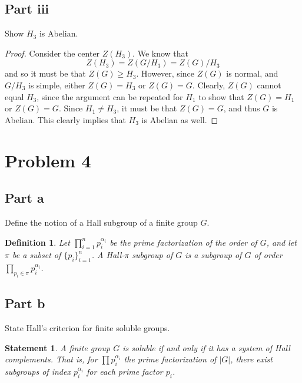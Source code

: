 \documentclass[12pt,reqno]{amsart}
\newtheorem*{definition}{Definition}
\newtheorem*{statement}{Statement}
\begin{document}
\subsection*{Part iii}
Show $H_3$ is Abelian.
\\
\begin{proof}
    Consider the center $Z(H_3)$. We know that
    \[
        Z(H_3) = Z(G/H_3) = Z(G)/H_3
    \]
    and so it must be that $Z(G)\geq H_3$. However, since $Z(G)$ is normal, and
    $G/H_3$ is simple, either $Z(G) = H_3$ or $Z(G) = G$. Clearly, $Z(G)$ cannot
    equal $H_3$, since the argument can be repeated for $H_1$ to show that $Z(G)
    = H_1$ or $Z(G)=G$. Since $H_1\neq H_3$, it must be that $Z(G) = G$, and
    thus $G$ is Abelian. This clearly implies that $H_3$ is Abelian as well.
\end{proof}

\newpage

\section*{Problem 4}
\subsection*{Part a}
Define the notion of a Hall subgroup of a finite group $G$.
\\
\begin{definition}
    Let $\prod_{i=1}^n p_i^{\alpha_i}$ be the prime factorization of the order
    of $G$, and let $\pi$ be a subset of $\{p_i\}_{i=1}^n$. A Hall-$\pi$
    subgroup of $G$ is a subgroup of $G$ of order $\prod_{p_i\in\pi}p_i^{\alpha_i}$.
\end{definition}

\subsection*{Part b}
State Hall's criterion for finite soluble groups.
\\
\begin{statement}
    A finite group $G$ is soluble if and only if it has a system of Hall
    complements. That is, for $\prod p_i^{\alpha_i}$ the prime factorization of
    $|G|$, there exist subgroups of index $p_i^{\alpha_i}$ for each prime
    factor $p_i$.
\end{statement}
\end{document}
